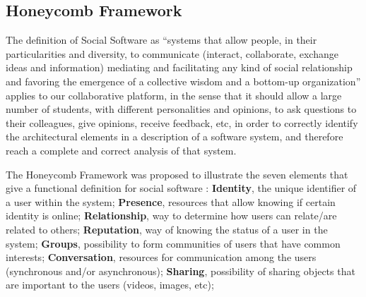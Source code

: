 \documentclass{llncs}
\begin{document}
\subsection{Honeycomb Framework}
The definition of Social Software as ``systems that allow people, in their particularities and diversity, to communicate (interact, collaborate, exchange ideas and information) mediating and facilitating any kind of social relationship and favoring the emergence of a collective wisdom and a bottom-up organization'' \cite{pereira2010social} applies to our collaborative platform, in the sense that it should allow a large number of students, with different personalities and opinions, to ask questions to their colleagues, give opinions, receive feedback, etc, in order to correctly identify the architectural elements in a description of a software system, and therefore reach a complete and correct analysis of that system. 

The Honeycomb Framework was proposed to illustrate the seven elements that give a functional definition for social software \cite{smith2007social}: \textbf{Identity}, the unique identifier of a user within the system; \textbf{Presence}, resources that allow knowing if certain identity is online; \textbf{Relationship}, way to determine how users can relate/are related to others; \textbf{Reputation}, way of knowing the status of a user in the system; \textbf{Groups}, possibility to form communities of users that have common interests; \textbf{Conversation}, resources for communication among the users (synchronous and/or asynchronous); \textbf{Sharing}, possibility of sharing objects that are important to the users (videos, images, etc);
\end{document}
